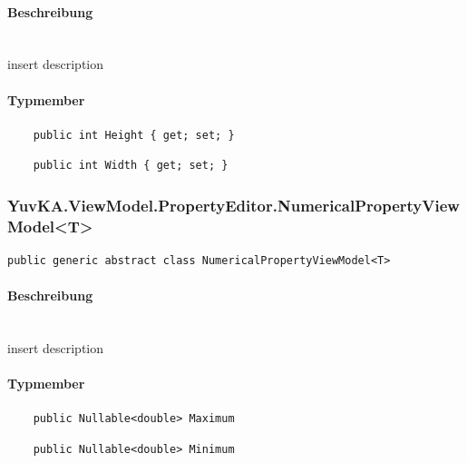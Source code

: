 \paragraph{Beschreibung}~\\
insert description
\paragraph{Typmember}
\begin{itemize}
	
	\begin{verbatim}
	public int Height { get; set; }
	\end{verbatim}

	\begin{verbatim}
	public int Width { get; set; }
	\end{verbatim}

\end{itemize}




\subsubsection{YuvKA.ViewModel.PropertyEditor.NumericalPropertyViewModel<T>}

\begin{verbatim}
public generic abstract class NumericalPropertyViewModel<T>
\end{verbatim}

\paragraph{Beschreibung}~\\
insert description

\paragraph{Typmember}
\begin{itemize}

	\begin{verbatim}
	public Nullable<double> Maximum
	\end{verbatim}

	\begin{verbatim}
	public Nullable<double> Minimum
	\end{verbatim}

\end{itemize}




